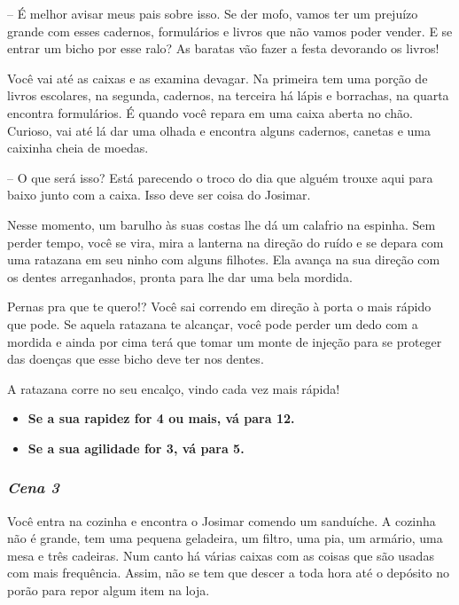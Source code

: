 -- É melhor avisar meus pais sobre isso. Se der mofo, vamos ter um prejuízo grande com esses cadernos, formulários e livros que não vamos poder vender. E se entrar um bicho por esse ralo? As baratas vão fazer a festa devorando os livros!

Você vai até as caixas e as examina devagar. Na primeira tem uma porção de livros escolares, na segunda, cadernos, na terceira há lápis e borrachas, na quarta encontra formulários. É quando você repara em uma caixa aberta no chão. Curioso, vai até lá dar uma olhada e encontra alguns cadernos, canetas e uma caixinha cheia de moedas.

-- O que será isso? Está parecendo o troco do dia que alguém trouxe aqui para baixo junto com a caixa. Isso deve ser coisa do Josimar.

Nesse momento, um barulho às suas costas lhe dá um calafrio na espinha. Sem perder tempo, você se vira, mira a lanterna na direção do ruído e se depara com uma ratazana em seu ninho com alguns filhotes. Ela avança na sua direção com os dentes arreganhados, pronta para lhe dar uma bela mordida.

Pernas pra que te quero!? Você sai correndo em direção à porta o mais rápido que pode. Se aquela ratazana te alcançar, você pode perder um dedo com a mordida e ainda por cima terá que tomar um monte de injeção para se proteger das doenças que esse bicho deve ter nos dentes.

A ratazana corre no seu encalço, vindo cada vez mais rápida!

\begin{itemize}
	\item \textbf{Se a sua rapidez for 4 ou mais, vá para 12.}
	\item \textbf{Se a sua agilidade for 3, vá para 5.}
\end{itemize}

\bigskip\medskip

\subsubsection{\textit{\textbf{Cena 3}}}
Você entra na cozinha e encontra o Josimar comendo um sanduíche. A cozinha não é grande, tem uma pequena geladeira, um filtro, uma pia, um armário, uma mesa e três cadeiras. Num canto há várias caixas com as coisas que são usadas com mais frequência. Assim, não se tem que descer a toda hora até o depósito no porão para repor algum item na loja.

